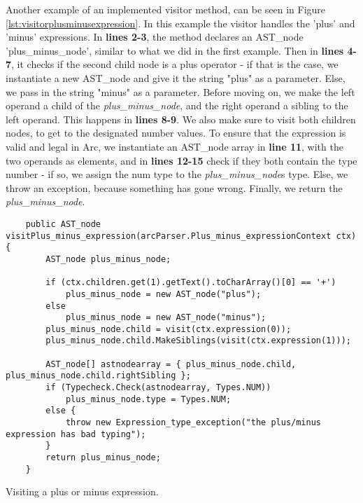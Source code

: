 Another example of an implemented visitor method, can be seen in Figure \ref{lst:visitorplusminusexpression}. In this example the visitor handles the 'plus' and 'minus' expressions. In \textbf{lines 2-3}, the method declares an AST\_node 'plus\_minus\_node', similar to what we did in the first example. Then in \textbf{lines 4-7}, it checks if the second child node is a plus operator - if that is the case, we instantiate a new AST\_node and give it the string "plus" as a parameter. Else, we pass in the string "minus" as a parameter. Before moving on, we make the left operand a child of the \textit{plus\_minus\_node}, and the right operand a sibling to the left operand. This happens in \textbf{lines 8-9}. We also make sure to visit both children nodes, to get to the designated number values. To ensure that the expression is valid and legal in Arc, we instantiate an AST\_node array in \textbf{line 11}, with the two operands as elements, and in \textbf{lines 12-15} check if they both contain the type number - if so, we assign the num type to the \textit{plus\_minus\_node}s type. Else, we throw an exception, because something has gone wrong. Finally, we return the \textit{plus\_minus\_node}.

\begin{listing}[htb!]
    \begin{verbatim}
    public AST_node visitPlus_minus_expression(arcParser.Plus_minus_expressionContext ctx) {
        AST_node plus_minus_node;

        if (ctx.children.get(1).getText().toCharArray()[0] == '+')
            plus_minus_node = new AST_node("plus");
        else
            plus_minus_node = new AST_node("minus");
        plus_minus_node.child = visit(ctx.expression(0));
        plus_minus_node.child.MakeSiblings(visit(ctx.expression(1)));

        AST_node[] astnodearray = { plus_minus_node.child, plus_minus_node.child.rightSibling };
        if (Typecheck.Check(astnodearray, Types.NUM))
            plus_minus_node.type = Types.NUM;
        else {
            throw new Expression_type_exception("the plus/minus expression has bad typing");
        }
        return plus_minus_node;
    }
    \end{verbatim}
    \caption{Visiting a plus or minus expression.}
    \label{lst:visitorplusminusexpression}
\end{listing}








